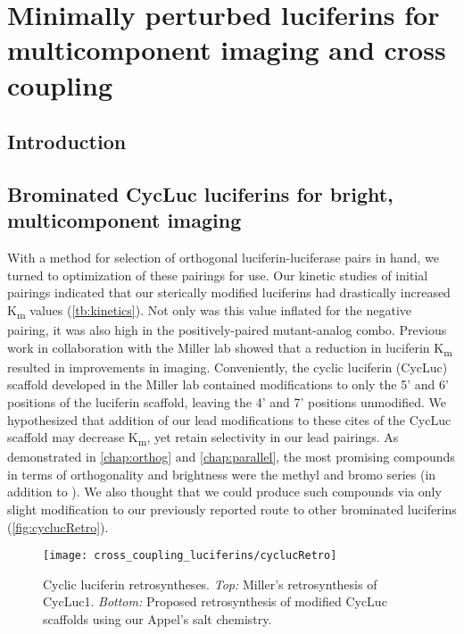 
\chapter{Minimally perturbed luciferins for multicomponent imaging and cross coupling}
\section{Introduction}


\section{Brominated CycLuc luciferins for bright, multicomponent imaging}
With a method for selection of orthogonal luciferin-luciferase pairs in hand, we turned to optimization of these pairings for \invivo{} use. Our kinetic studies of initial pairings indicated that our sterically modified luciferins had drastically increased K\textsubscript{m} values (\autoref{tb:kinetics}). Not only was this value inflated for the negative pairing, it was also high in the positively-paired mutant-analog combo. Previous work in collaboration with the Miller lab showed that a reduction in luciferin K\textsubscript{m} resulted in improvements in \invivo{} imaging.\cite{Evanssyntheticluciferinimproves2014}
Conveniently, the cyclic luciferin (CycLuc) scaffold developed in the Miller lab contained modifications to only the 5' and 6' positions of the luciferin scaffold, leaving the 4' and 7' positions unmodified.\cite{ReddyRobustlightemission2010,MoffordAminoluciferinsExtendFirefly2014}
We hypothesized that addition of our lead modifications to these cites of the CycLuc scaffold may decrease K\textsubscript{m}, yet retain selectivity in our lead pairings.
As demonstrated in \autoref{chap:orthog} and \autoref{chap:parallel}, the most promising compounds in terms of orthogonality and brightness were the methyl and bromo series (in addition to \dluc).
We also thought that we could produce such compounds via only slight modification to our previously reported route to other brominated luciferins (\autoref{fig:cyclucRetro}).\cite{SteinhardtBrominatedLuciferinsAre2016}

\begin{figure}[htbp]
\texttt{[image: cross\_coupling\_luciferins/cyclucRetro]} %
\centering
\caption[Cyclic luciferin retrosyntheses.]{
Cyclic luciferin retrosyntheses. \textit{Top:} Miller's retrosynthesis of CycLuc1. \textit{Bottom:} Proposed retrosynthesis of modified CycLuc scaffolds using our Appel's salt chemistry.
}
  \label{fig:cyclucRetro}
\end{figure}


